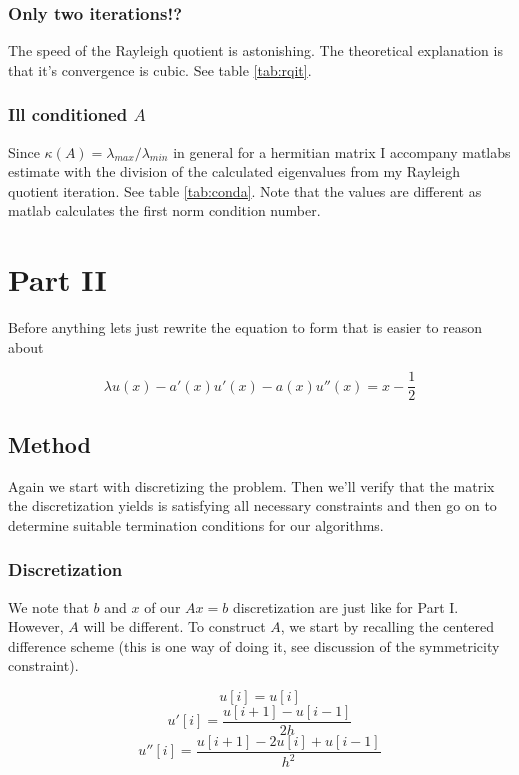 \documentclass[a4paper,11pt]{article}
\begin{document}
\subsubsection{Only two iterations!?}

The speed of the Rayleigh quotient is astonishing. The theoretical
explanation is that it's convergence is cubic. See table
\ref{tab:rqit}.

\subsubsection{Ill conditioned $A$}

Since $\kappa(A) = \lambda_{max}/\lambda_{min}$ in general for a
hermitian matrix I accompany matlabs estimate with the division of the
calculated eigenvalues from my Rayleigh quotient iteration. See table
\ref{tab:conda}. Note that the values are different as matlab calculates
the first norm condition number.

\section{Part II}

Before anything lets just rewrite the equation to form that is easier to
reason about

\[
  \lambda u(x) - a'(x)u'(x) - a(x)u''(x) = x - \frac{1}{2}
\]

\subsection{Method}

Again we start with discretizing the problem. Then we'll verify that the matrix
the discretization yields is satisfying all necessary constraints and then go
on to determine suitable termination conditions for our algorithms.

\subsubsection{Discretization}

We note that $b$ and $x$ of our $Ax=b$ discretization are just like for
Part I.  However, $A$ will be different. To construct $A$, we start by
recalling the centered difference scheme (this is one way of doing it,
see discussion of the symmetricity constraint).

\[
  u[i] = u[i]
\]
\[
  u'[i] = \frac{u[i+1]-u[i-1]}{2h}
\]
\[
  u''[i] = \frac{u[i+1]-2u[i]+u[i-1]}{h^2}
\]
\end{document}
